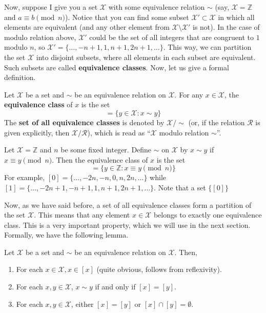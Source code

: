 \documentclass[../lecture-notes.tex]{subfiles}
\begin{document}
Now, suppose I give you a set $\mathcal{X}$ with some equivalence relation $\sim$ (say, $\mathcal{X} = \mathbb{Z}$ and $a \equiv b \pmod{n}$). Notice that you can find some subset $\mathcal{X}' \subset \mathcal{X}$ in which all elements are equivalent (and any other element from $\mathcal{X} \setminus \mathcal{X}'$ is not). In the case of modulo relation above, $\mathcal{X}'$ could be the set of all integers that are congruent to $1$ modulo $n$, so $\mathcal{X}' = \{\dots,-n+1,1,n+1,2n+1,\dots\}$. This way, we can partition the set $\mathcal{X}$ into disjoint subsets, where all elements in each subset are equivalent. Such subsets are called \textbf{equivalence classes}. Now, let us give a formal definition.

\begin{definition}
    Let $\mathcal{X}$ be a set and $\sim$ be an equivalence relation on $\mathcal{X}$. For any $x \in \mathcal{X}$, the \textbf{equivalence class} of $x$ is the set
    \begin{equation}
        [x] = \{y \in \mathcal{X}: x \sim y\}
    \end{equation}
    The \textbf{set of all equivalence classes} is denoted by $\mathcal{X}/\text{$\sim$}$ (or, if the relation $\mathcal{R}$ is given explicitly, then $\mathcal{X}/\mathcal{R}$), which is read as ``$\mathcal{X}$ modulo relation $\sim$''.
\end{definition}

\begin{example}
    Let $\mathcal{X} = \mathbb{Z}$ and $n$ be some fixed integer. Define $\sim$ on $\mathcal{X}$ by $x \sim y$ if $x \equiv y \pmod{n}$. Then the equivalence class of $x$ is the set
    \begin{equation}
        [x] = \{y \in \mathbb{Z}: x \equiv y \pmod{n}\}
    \end{equation}
    For example, $[0] = \{\ldots,-2n,-n,0,n,2n,\ldots\}$ while $[1] = \{\ldots,-2n+1,-n+1,1,n+1,2n+1,\ldots\}$. Note that a set $\{[0]\}$
\end{example}

Now, as we have said before, a set of all equivalence classes form a partition of the set $\mathcal{X}$. This means that any element $x \in \mathcal{X}$ belongs to exactly one equivalence class. This is a very important property, which we will use in the next section. Formally, we have the following lemma.
\begin{lemma}
    Let $\mathcal{X}$ be a set and $\sim$ be an equivalence relation on $\mathcal{X}$. Then,
    \begin{enumerate}
        \item For each $x \in \mathcal{X}, x \in [x]$ (quite obvious, follows from reflexivity).
        \item For each $x,y \in \mathcal{X}$, $x \sim y$ if and only if $[x] = [y]$.
        \item For each $x,y \in \mathcal{X}$, either $[x]=[y]$ or $[x] \cap [y] = \emptyset$.
    \end{enumerate}
\end{lemma}
\end{document}
